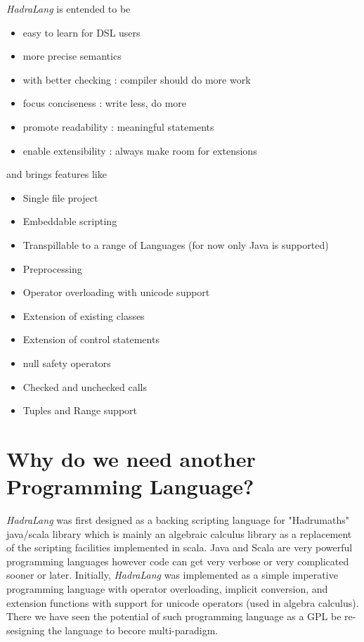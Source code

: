 \documentclass{tufte-book}
\begin{document}
        \textit{HadraLang} is entended to be
        \begin{itemize}
        \item easy to learn for DSL users
        \item more precise semantics
        \item with better checking : compiler should do more work
        \item focus conciseness : write less, do more
        \item promote readability : meaningful statements
        \item enable extensibility : always make room for extensions
        \end{itemize}

        and brings features like
        \begin{itemize}
        \item Single file project
        \item Embeddable scripting
        \item Transpillable to a range of Languages (for now only Java is supported)
        \item Preprocessing
        \item Operator overloading with unicode support
        \item Extension of existing classes
        \item Extension of control statements
        \item null safety operators
        \item Checked and unchecked calls
        \item Tuples and Range support
        \end{itemize}


        \section*{Why do we need another Programming Language?}
        \textit{HadraLang} was first designed as a backing scripting language for "Hadrumaths" java/scala library which is mainly an algebraic calculus library as a replacement of the scripting facilities implemented in scala. Java and Scala are very powerful programming languages however code can get very verbose or very complicated sooner or later.        
        Initially, \textit{HadraLang} was implemented as a simple imperative programming language with operator overloading, implicit conversion, and extension functions with support for unicode operators (used in algebra calculus). There we have seen the potential of such programming language as a GPL be re-sesigning the language to becore multi-paradigm.
        
\end{document}
